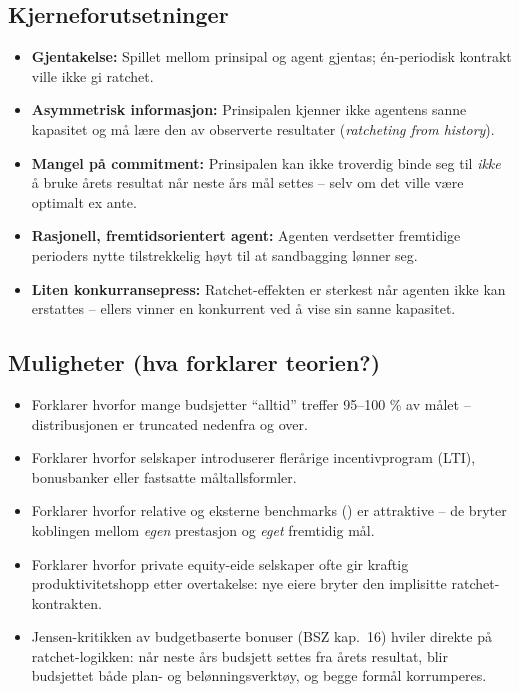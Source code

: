 \subsection*{Kjerneforutsetninger}
\begin{itemize}
\item \textbf{Gjentakelse:} Spillet mellom prinsipal og agent gjentas; én-periodisk kontrakt ville ikke gi ratchet.
\item \textbf{Asymmetrisk informasjon:} Prinsipalen kjenner ikke agentens sanne kapasitet og må lære den av observerte resultater (\emph{ratcheting from history}).
\item \textbf{Mangel på commitment:} Prinsipalen kan ikke troverdig binde seg til \emph{ikke} å bruke årets resultat når neste års mål settes -- selv om det ville være optimalt ex ante.
\item \textbf{Rasjonell, fremtidsorientert agent:} Agenten verdsetter fremtidige perioders nytte tilstrekkelig høyt til at sandbagging lønner seg.
\item \textbf{Liten konkurransepress:} Ratchet-effekten er sterkest når agenten ikke kan erstattes -- ellers vinner en konkurrent ved å vise sin sanne kapasitet.
\end{itemize}

\subsection*{Muligheter (hva forklarer teorien?)}
\begin{itemize}
\item Forklarer hvorfor mange budsjetter ``alltid'' treffer 95--100 \% av målet -- distribusjonen er truncated nedenfra og over.
\item Forklarer hvorfor selskaper introduserer flerårige incentivprogram (LTI), bonusbanker eller fastsatte måltallsformler.
\item Forklarer hvorfor relative og eksterne benchmarks () er attraktive -- de bryter koblingen mellom \emph{egen} prestasjon og \emph{eget} fremtidig mål.
\item Forklarer hvorfor private equity-eide selskaper ofte gir kraftig produktivitetshopp etter overtakelse: nye eiere bryter den implisitte ratchet-kontrakten.
\item Jensen-kritikken av budgetbaserte bonuser (BSZ kap.\ 16) hviler direkte på ratchet-logikken: når neste års budsjett settes fra årets resultat, blir budsjettet både plan- og belønningsverktøy, og begge formål korrumperes.
\end{itemize}

